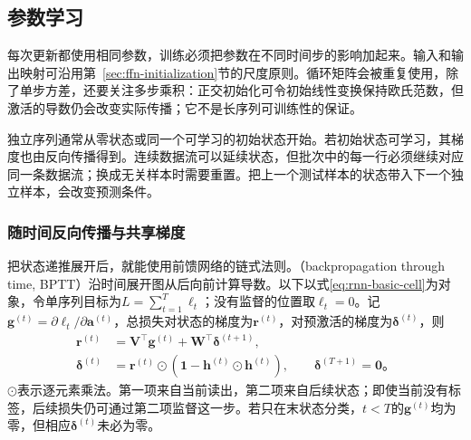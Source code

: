 \subsection{参数学习}
\label{sec:rnn-learning}

每次更新都使用相同参数，训练必须把参数在不同时间步的影响加起来。输入和输出映射可沿用第~\ref{sec:ffn-initialization}节的尺度原则。循环矩阵会被重复使用，除了单步方差，还要关注多步乘积：正交初始化可令初始线性变换保持欧氏范数，但激活的导数仍会改变实际传播；它不是长序列可训练性的保证。

独立序列通常从零状态或同一个可学习的初始状态开始。若初始状态可学习，其梯度也由反向传播得到。连续数据流可以延续状态，但批次中的每一行必须继续对应同一条数据流；换成无关样本时需要重置。把上一个测试样本的状态带入下一个独立样本，会改变预测条件。

\subsubsection{随时间反向传播与共享梯度}
\label{sec:rnn-bptt}

把状态递推展开后，就能使用前馈网络的链式法则。（backpropagation through time, BPTT）沿时间展开图从后向前计算导数。以下以式\eqref{eq:rnn-basic-cell}为对象，令单序列目标为$L=\sum_{t=1}^{T}\ell_t$；没有监督的位置取$\ell_t=0$。记$\bm{g}^{(t)}=\partial\ell_t/\partial\bm{a}^{(t)}$，总损失对状态的梯度为$\bm{r}^{(t)}$，对预激活的梯度为$\bm{\delta}^{(t)}$，则
\begin{equation}
  \begin{aligned}
    \bm{r}^{(t)}&=\bm{V}^{\top}\bm{g}^{(t)}
       +\bm{W}^{\top}\bm{\delta}^{(t+1)},\\
    \bm{\delta}^{(t)}&=\bm{r}^{(t)}\odot
      \left(\bm{1}-\bm{h}^{(t)}\odot\bm{h}^{(t)}\right),
      \qquad \bm{\delta}^{(T+1)}=\bm{0}\text{。}
  \end{aligned}
  \label{eq:rnn-backward-recursion}
\end{equation}
$\odot$表示逐元素乘法。第一项来自当前读出，第二项来自后续状态；即使当前没有标签，后续损失仍可通过第二项监督这一步。若只在末状态分类，$t<T$的$\bm{g}^{(t)}$均为零，但相应$\bm{\delta}^{(t)}$未必为零。

